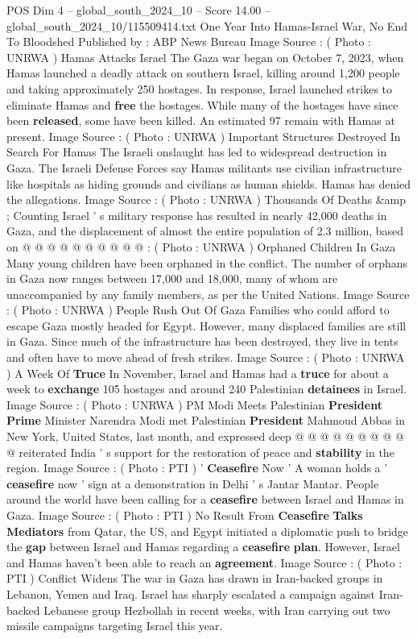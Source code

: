 \begin{textsample}{POS Dim 4 – global\_south\_2024\_10 – Score 14.00 – global\_south\_2024\_10/115509414.txt}  \label{ex:f4_pos_400}
One Year Into Hamas-Israel War, No End To Bloodshed Published by : ABP News Bureau Image Source : ( Photo : UNRWA ) Hamas Attacks Israel The Gaza war began on October 7, 2023, when Hamas launched a deadly attack on southern Israel, killing around 1,200 people and taking approximately 250 hostages.
In response, Israel launched strikes to eliminate Hamas and \textbf{free} the hostages.
While many of the hostages have since been \textbf{released}, some have been killed.
An estimated 97 remain with Hamas at present.
Image Source : ( Photo : UNRWA ) Important Structures Destroyed In Search For Hamas The Israeli onslaught has led to widespread destruction in Gaza.
The Israeli Defense Forces say Hamas militants use civilian infrastructure like hospitals as hiding grounds and civilians as human shields.
Hamas has denied the allegations.
Image Source : ( Photo : UNRWA ) Thousands Of Deaths \&amp ; Counting Israel ' s military response has resulted in nearly 42,000 deaths in Gaza, and the displacement of almost the entire population of 2.3 million, based on @ @ @ @ @ @ @ @ @ @ : ( Photo : UNRWA ) Orphaned Children In Gaza Many young children have been orphaned in the conflict.
The number of orphans in Gaza now ranges between 17,000 and 18,000, many of whom are unaccompanied by any family members, as per the United Nations.
Image Source : ( Photo : UNRWA ) People Rush Out Of Gaza Families who could afford to escape Gaza mostly headed for Egypt.
However, many displaced families are still in Gaza.
Since much of the infrastructure has been destroyed, they live in tents and often have to move ahead of fresh strikes.
Image Source : ( Photo : UNRWA ) A Week Of \textbf{Truce} In November, Israel and Hamas had a \textbf{truce} for about a week to \textbf{exchange} 105 hostages and around 240 Palestinian \textbf{detainees} in Israel.
Image Source : ( Photo : UNRWA ) PM Modi Meets Palestinian \textbf{President} \textbf{Prime} Minister Narendra Modi met Palestinian \textbf{President} Mahmoud Abbas in New York, United States, last month, and expressed deep @ @ @ @ @ @ @ @ @ @ reiterated India ' s support for the restoration of peace and \textbf{stability} in the region.
Image Source : ( Photo : PTI ) ' \textbf{Ceasefire} Now ' A woman holds a ' \textbf{ceasefire} now ' sign at a demonstration in Delhi ' s Jantar Mantar.
People around the world have been calling for a \textbf{ceasefire} between Israel and Hamas in Gaza.
Image Source : ( Photo : PTI ) No Result From \textbf{Ceasefire} \textbf{Talks} \textbf{Mediators} from Qatar, the US, and Egypt initiated a diplomatic push to bridge the \textbf{gap} between Israel and Hamas regarding a \textbf{ceasefire} \textbf{plan}.
However, Israel and Hamas haven't been able to reach an \textbf{agreement}.
Image Source : ( Photo : PTI ) Conflict Widens The war in Gaza has drawn in Iran-backed groups in Lebanon, Yemen and Iraq.
Israel has sharply escalated a campaign against Iran-backed Lebanese group Hezbollah in recent weeks, with Iran carrying out two missile campaigns targeting Israel this year.

\end{textsample}
